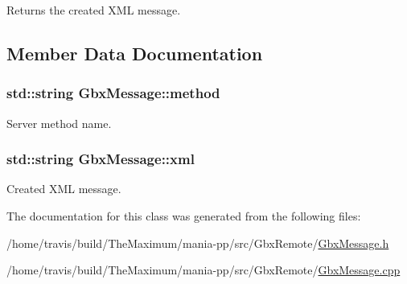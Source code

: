 Returns the created X\-M\-L message. 



\subsection{Member Data Documentation}
\hypertarget{classGbxMessage_a10b6118916999db98f28e3f495eef6b4}{
\subsubsection[{method}]{\setlength{\rightskip}{0pt plus 5cm}std\-::string Gbx\-Message\-::method\hspace{0.3cm}{\ttfamily [private]}}}\label{classGbxMessage_a10b6118916999db98f28e3f495eef6b4}


Server method name. 

\hypertarget{classGbxMessage_a6ea9adbeb3f1c104fa08fce0b1a4090d}{
\subsubsection[{xml}]{\setlength{\rightskip}{0pt plus 5cm}std\-::string Gbx\-Message\-::xml\hspace{0.3cm}{\ttfamily [private]}}}\label{classGbxMessage_a6ea9adbeb3f1c104fa08fce0b1a4090d}


Created X\-M\-L message. 



The documentation for this class was generated from the following files\-:\begin{DoxyCompactItemize}
\item 
/home/travis/build/\-The\-Maximum/mania-\/pp/src/\-Gbx\-Remote/\hyperlink{GbxMessage_8h}{Gbx\-Message.\-h}\item 
/home/travis/build/\-The\-Maximum/mania-\/pp/src/\-Gbx\-Remote/\hyperlink{GbxMessage_8cpp}{Gbx\-Message.\-cpp}\end{DoxyCompactItemize}
